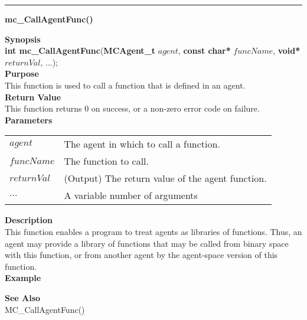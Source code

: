 \noindent
\vspace{5pt}
\rule{6.5in}{0.015in}
\noindent
{}
{\LARGE \bf mc\_CallAgentFunc()}\\

\noindent
{\bf Synopsis}\\
{\bf int mc\_CallAgentFunc}({\bf MCAgent\_t} $agent$, {\bf const char*} $funcName$, {\bf void*} $returnVal$, ...);\\

\noindent
{\bf Purpose}\\
This function is used to call a function that is defined in an agent. \\

\noindent
{\bf Return Value}\\
This function returns 0 on success, or a non-zero error code on failure. \\

\noindent
{\bf Parameters}
\vspace{-0.1in}
\begin{description}
\item
\begin{tabular}{ll}
$agent$ & The agent in which to call a function. \\
$funcName$ & The function to call. \\
$returnVal$ & (Output) The return value of the agent function. \\
$...$ &  A variable number of arguments 
\end{tabular}
\end{description}

\noindent
{\bf Description}\\
This function enables a program to treat agents as libraries of functions. Thus, an agent
may provide a library of functions that may be called from binary space with this function, 
or from another agent by the agent-space version of this function. \\

\noindent
{\bf Example}\\
\noindent
{\footnotesize}

\noindent
{\bf See Also}\\
MC\_CallAgentFunc()


